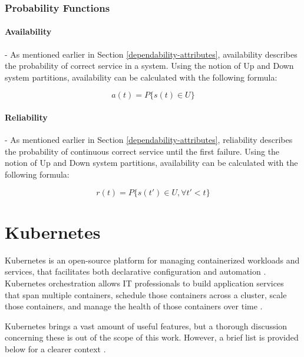 \subsubsection{Probability Functions} \label{background-dep-metrics-prob-funcs}

\paragraph{Availability} - As mentioned earlier in Section \ref{dependability-attributes}, availability describes the probability of correct service in a system. Using the notion of Up and Down system partitions, availability can be calculated with the following formula:

\[
a(t) = P\{ s(t) \in U \}
\]

\paragraph{Reliability} - As mentioned earlier in Section \ref{dependability-attributes}, reliability describes the probability of continuous correct service until the first failure. Using the notion of Up and Down system partitions, availability can be calculated with the following formula:

\[
r(t) = P\{ s(t') \in U, \forall t' < t \}
\]


\section{Kubernetes}

Kubernetes is an open-source platform for managing containerized workloads and services, that facilitates both declarative configuration and automation \cite{KubernetesOverview}. Kubernetes orchestration allows IT professionals to build application services that span multiple containers, schedule those containers across a cluster, scale those containers, and manage the health of those containers over time \cite{KubernetesOverviewRH}.

Kubernetes brings a vast amount of useful features, but a thorough discussion concerning these is out of the scope of this work. However, a brief list is provided below for a clearer context \cite{KubernetesOverview}.

